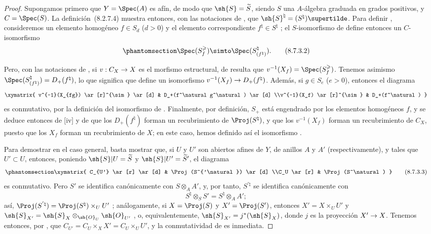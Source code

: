 \documentclass[oneside,10pt]{amsart}
\makeatletter
\renewcommand{\geq}{\geqslant}
\newcommand{\ega@arrow}[2]{\mathchoice{#1}{#2}{#2}{#2}}
\renewcommand{\to}{\ega@arrow{\longrightarrow}{\rightarrow}}
\newcommand{\oldpage}[2][]{\marginnote{\normalfont\footnotesize\textbf{#1}~|~#2}\ignorespaces}
\let\EGAOriginalLabel\label
\renewcommand{\label}[1]{\phantomsection\EGAOriginalLabel{#1}}
\makeatother
\begin{document}
\begin{proof}
Supongamos primero que $Y=\Spec(A)$ es afín, de modo que $\sh{S}=\widetilde{S}$, siendo $S$ una $A$-álgebra graduada en grados positivos, y $C=\Spec(S)$.
La definición~\textup{(8.2.7.4)} muestra entonces, con las notaciones de , que $\sh{S}^\natural=(S^\natural)\supertilde$.
Para definir , consideremos un elemento homogéneo $f\in S_d$ ($d>0$) y el elemento correspondiente $f^\natural\in S^\natural$ ;
el $S$-isomorfismo de  define entonces un $C$-isomorfismo
\[
\label{II.8.7.3.2}
  \Spec(S_f^\geq) \simto \Spec(S_{(f^\natural)}^\natural).
\tag{8.7.3.2}
\]

\oldpage[II]{175}
Pero, con las notaciones de , si $v:C_X\to X$ es el morfismo estructural, de  resulta que $v^{-1}(X_f)=\Spec(S_f^\geq)$.
Tenemos asimismo $\Spec(S_{(f^\natural)}^\natural)=D_+(f^\natural)$, lo que significa que  define un isomorfismo $v^{-1}(X_f)\to D_+(f^\natural)$.
Además, si $g\in S_e$ ($e>0$), entonces el diagrama
\[
  \xymatrix{
    v^{-1}(X_{fg})
      \ar[r]^{\sim}
      \ar[d]
  & D_+(f^\natural g^\natural)
      \ar[d]
  \\v^{-1}(X_f)
      \ar[r]^{\sim}
  & D_+(f^\natural)
  }
\]
es conmutativo, por la definición del isomorfismo de .
Finalmente, por definición, $S_+$ está engendrado por los elementos homogéneos $f$, y se deduce entonces de [iv] y de  que los $D_+(f^\natural)$ forman un recubrimiento de $\Proj(S^\natural)$, y que los $v^{-1}(X_f)$ forman un recubrimiento de $C_X$, puesto que los $X_f$ forman un recubrimiento de $X$;
en este caso, hemos definido así el isomorfismo .

Para demostrar  en el caso general, basta mostrar que, si $U$ y $U'$ son abiertos afines de $Y$, de anillos $A$ y $A'$ (respectivamente), y tales que $U'\subset U$, entonces, poniendo $\sh{S}|U=\widetilde{S}$ y $\sh{S}|U'=\widetilde S'$, el diagrama
\[
\label{II.8.7.3.3}
  \xymatrix{
    C_{U'}
      \ar[r]
      \ar[d]
  & \Proj(S^{'\natural})
      \ar[d]
  \\C_U
      \ar[r]
  & \Proj(S^\natural)
  }
\tag{8.7.3.3}
\]
es conmutativo.
Pero $S'$ se identifica canónicamente con $S\otimes_A A'$, y, por tanto, $S^{'\natural}$ se identifica canónicamente con
\[
  S^\natural \otimes_S S' = S^\natural \otimes_A A';
\]
así, $\Proj(S^{'\natural}) = \Proj(S^\natural)\times_U U'$ ;
análogamente, si $X=\Proj(S)$ y $X'=\Proj(S')$, entonces $X'=X\times_U U'$ y $\sh{S}_{X'}=\sh{S}_X\otimes_{\sh{O}_U}\sh{O}_{U'}$ , o, equivalentemente, $\sh{S}_{X'}=j^*(\sh{S}_X)$, donde $j$ es la proyección $X'\to X$.
Tenemos entonces, por , que $C_{U'} = C_U\times_X X' = C_U\times_U U'$, y la conmutatividad de  es inmediata.
\end{proof}
\end{document}
